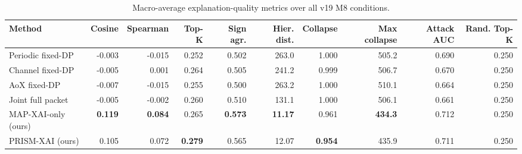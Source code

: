 
\begin{table}[t]
\centering
\caption{Macro-average explanation-quality metrics over all v19 M8 conditions.}
\label{tab:macroexp}
\scriptsize
\setlength{\tabcolsep}{3pt}
\renewcommand{\arraystretch}{1.08}

\begin{adjustbox}{max width=\textwidth}
\begin{tabular}{lrrrrrrrrr}
\toprule
Method
& Cosine
& Spearman
& Top-K
& Sign agr.
& Hier. dist.
& Collapse
& Max collapse
& Attack AUC
& Rand. Top-K \\
\midrule

Periodic fixed-DP
& -0.003 & -0.015 & 0.252 & 0.502
& 263.0 & 1.000 & 505.2 & 0.690 & 0.250 \\

Channel fixed-DP
& -0.005 & 0.001 & 0.264 & 0.505
& 241.2 & 0.999 & 506.7 & 0.670 & 0.250 \\

AoX fixed-DP
& -0.007 & -0.015 & 0.255 & 0.500
& 263.2 & 1.000 & 510.1 & 0.664 & 0.250 \\

Joint full packet
& -0.005 & -0.002 & 0.260 & 0.510
& 131.1 & 1.000 & 506.1 & 0.661 & 0.250 \\

\midrule

MAP-XAI-only (ours)
& \textbf{0.119}
& \textbf{0.084}
& 0.265
& \textbf{0.573}
& \textbf{11.17}
& 0.961
& \textbf{434.3}
& 0.712
& 0.250 \\

PRISM-XAI (ours)
& 0.105
& 0.072
& \textbf{0.279}
& 0.565
& 12.07
& \textbf{0.954}
& 435.9
& 0.711
& 0.250 \\

\bottomrule
\end{tabular}
\end{adjustbox}
\end{table}